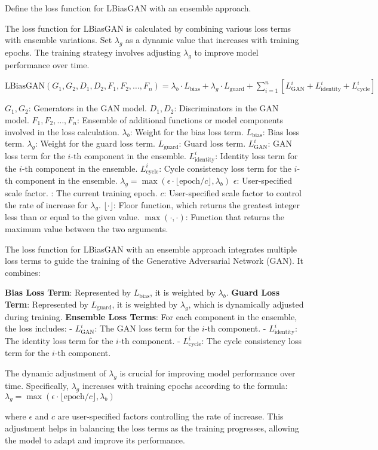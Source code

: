 Define the loss function for LBiasGAN with an ensemble approach.

The loss function for LBiasGAN is calculated by combining various loss terms with ensemble variations.
Set \( \lambda_g \) as a dynamic value that increases with training epochs.
The training strategy involves adjusting \( \lambda_g \) to improve model performance over time.

$\text{LBiasGAN}(G_1, G_2, D_1, D_2, F_1, F_2, \dots, F_n) = \lambda_b \cdot L_{\text{bias}} + \lambda_g \cdot L_{\text{guard}} + \sum_{i=1}^{n} \left[L_{\text{GAN}}^i + L_{\text{identity}}^i + L_{\text{cycle}}^i\right]$

$G_1, G_2$: Generators in the GAN model.
$D_1, D_2$: Discriminators in the GAN model.
$F_1, F_2, \dots, F_n$: Ensemble of additional functions or model components involved in the loss calculation.
$\lambda_b$: Weight for the bias loss term.
$L_{\text{bias}}$: Bias loss term.
$\lambda_g$: Weight for the guard loss term.
$L_{\text{guard}}$: Guard loss term.
$L_{\text{GAN}}^i$: GAN loss term for the $i$-th component in the ensemble.
$L_{\text{identity}}^i$: Identity loss term for the $i$-th component in the ensemble.
$L_{\text{cycle}}^i$: Cycle consistency loss term for the $i$-th component in the ensemble.
$\lambda_g = \max(\epsilon \cdot \lfloor \text{epoch} / c \rfloor, \lambda_b)$
$\epsilon$: User-specified scale factor.
: The current training epoch.
$c$: User-specified scale factor to control the rate of increase for \( \lambda_g \).
$\lfloor \cdot \rfloor$: Floor function, which returns the greatest integer less than or equal to the given value.
$\max(\cdot, \cdot)$: Function that returns the maximum value between the two arguments.

The loss function for LBiasGAN with an ensemble approach integrates multiple loss terms to guide the training of the Generative Adversarial Network (GAN). It combines:

\textbf{Bias Loss Term}: Represented by $L_{\text{bias}}$, it is weighted by $\lambda_b$.
\textbf{Guard Loss Term}: Represented by $L_{\text{guard}}$, it is weighted by $\lambda_g$, which is dynamically adjusted during training.
\textbf{Ensemble Loss Terms}: For each component in the ensemble, the loss includes:
   - $L_{\text{GAN}}^i$: The GAN loss term for the $i$-th component.
   - $L_{\text{identity}}^i$: The identity loss term for the $i$-th component.
   - $L_{\text{cycle}}^i$: The cycle consistency loss term for the $i$-th component.

The dynamic adjustment of $\lambda_g$ is crucial for improving model performance over time. Specifically, $\lambda_g$ increases with training epochs according to the formula:
$\lambda_g = \max(\epsilon \cdot \lfloor \text{epoch} / c \rfloor, \lambda_b)$

where $\epsilon$ and $c$ are user-specified factors controlling the rate of increase. This adjustment helps in balancing the loss terms as the training progresses, allowing the model to adapt and improve its performance.


